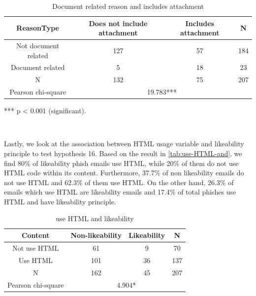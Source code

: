 \begin{minipage}[t]{1\columnwidth}%
\begin{longtable}{cccc}
\caption{\label{tab:Document-related-reason-1}Document related reason and
includes attachment}
\tabularnewline
\toprule 
{\footnotesize{}ReasonType} & {\footnotesize{}Does not include attachment} & {\footnotesize{}Includes attachment} & \multirow{1}{*}{{\footnotesize{}N}}\tabularnewline
\midrule 
\multirow{1}{*}{{\footnotesize{}Not document related}} & {\footnotesize{}127} & {\footnotesize{}57} & \multirow{1}{*}{{\footnotesize{}184}}\tabularnewline
\midrule 
\multirow{1}{*}{{\footnotesize{}Document related}} & {\footnotesize{}5} & {\footnotesize{}18} & \multirow{1}{*}{{\footnotesize{}23}}\tabularnewline
\midrule 
{\footnotesize{}N} & {\footnotesize{}132} & {\footnotesize{}75} & {\footnotesize{}207}\tabularnewline
\midrule 
{\footnotesize{}Pearson chi-square} & \multicolumn{3}{c}{{\footnotesize{}19.783{*}{*}{*}}}\tabularnewline
\midrule
\end{longtable}%
\end{minipage}

{*}{*}{*} p < 0.001 (significant).

\ 

Lastly, we look at the association between HTML usage variable and
likeability principle to test hypothesis 16. Based on the result in
\autoref{tab:use-HTML-and}, we find 80\% of likeability phish emails
use HTML, while 20\% of them do not use HTML code within its content.
Furthermore, 37.7\% of non likeability emails do not use HTML and
62.3\% of them use HTML. On the other hand, 26.3\% of emails which
use HTML are likeability emails and 17.4\% of total phishes use HTML
and have likeability principle. 

\begin{minipage}[t]{1\columnwidth}%
\begin{longtable}{cccc}
\caption{\label{tab:use-HTML-and}use HTML and likeability}
\tabularnewline
\toprule 
{\footnotesize{}Content} & {\footnotesize{}Non-likeability} & {\footnotesize{}Likeability} & \multirow{1}{*}{{\footnotesize{}N}}\tabularnewline
\midrule 
\multirow{1}{*}{{\footnotesize{}Not use HTML}} & {\footnotesize{}61} & {\footnotesize{}9} & \multirow{1}{*}{{\footnotesize{}70}}\tabularnewline
\midrule 
\multirow{1}{*}{{\footnotesize{}Use HTML}} & {\footnotesize{}101} & {\footnotesize{}36} & \multirow{1}{*}{{\footnotesize{}137}}\tabularnewline
\midrule 
{\footnotesize{}N} & {\footnotesize{}162} & {\footnotesize{}45} & {\footnotesize{}207}\tabularnewline
\midrule 
{\footnotesize{}Pearson chi-square} & \multicolumn{3}{c}{{\footnotesize{}4.904{*}}}\tabularnewline
\midrule
\end{longtable}%
\end{minipage}

